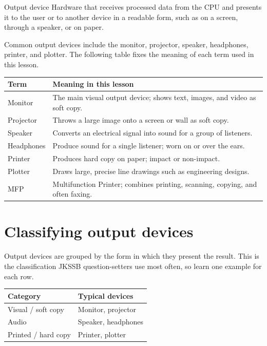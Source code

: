 \begin{definitionbox}{Output device}
Hardware that receives processed data from the CPU and presents it to the
user or to another device in a readable form, such as on a screen, through a
speaker, or on paper.
\end{definitionbox}

Common output devices include the monitor, projector, speaker, headphones,
printer, and plotter. The following table fixes the meaning of each term used
in this lesson.

\begin{center}
\begin{tabular}{p{}p{}}
\toprule
\textbf{Term} & \textbf{Meaning in this lesson} \\
\midrule
Monitor & The main visual output device; shows text, images, and video as soft copy. \\
Projector & Throws a large image onto a screen or wall as soft copy. \\
Speaker & Converts an electrical signal into sound for a group of listeners. \\
Headphones & Produce sound for a single listener; worn on or over the ears. \\
Printer & Produces hard copy on paper; impact or non-impact. \\
Plotter & Draws large, precise line drawings such as engineering designs. \\
MFP & Multifunction Printer; combines printing, scanning, copying, and often faxing. \\
\bottomrule
\end{tabular}
\end{center}

\section{Classifying output devices}
Output devices are grouped by the form in which they present the result. This
is the classification JKSSB question-setters use most often, so learn one
example for each row.

\begin{center}
\begin{tabular}{p{}p{}}
\toprule
\textbf{Category} & \textbf{Typical devices} \\
\midrule
Visual / soft copy & Monitor, projector \\
Audio & Speaker, headphones \\
Printed / hard copy & Printer, plotter \\
\bottomrule
\end{tabular}
\end{center}

